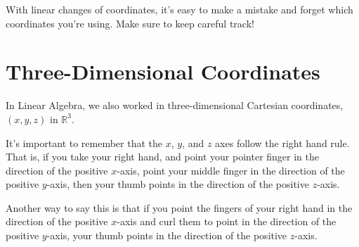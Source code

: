 \documentclass{ximera}
\begin{document}
With linear changes of coordinates, it's easy to make a mistake and forget which coordinates you're using. Make sure to keep careful track!

\section{Three-Dimensional Coordinates}

In Linear Algebra, we also worked in three-dimensional Cartesian coordinates, $(x,y,z)$ in $\mathbb{R}^3$.

\begin{image}
\end{image}

It's important to remember that the $x$, $y$, and $z$ axes follow the right hand rule. That is, if you take your right hand, and point your pointer finger in the direction of the positive $x$-axis, point your middle finger in the direction of the positive $y$-axis, then your thumb points in the direction of the positive $z$-axis.

Another way to say this is that if you point the fingers of your right hand in the direction of the positive $x$-axis and curl them to point in the direction of the positive $y$-axis, your thumb points in the direction of the positive $z$-axis.
\end{document}
